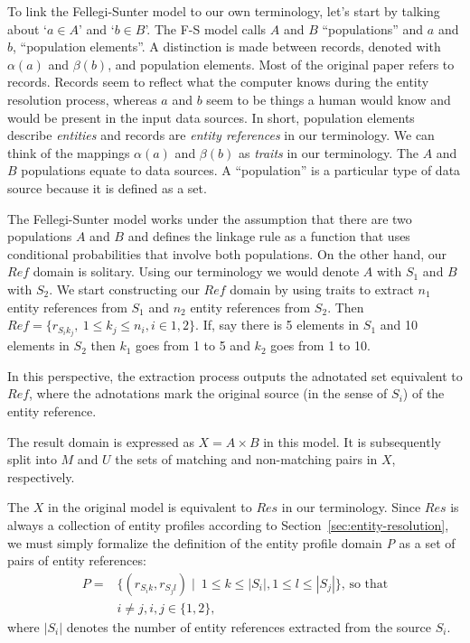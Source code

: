 To link the Fellegi-Sunter model to our own terminology, let's start by talking
about `$a \in A$' and `$b \in B$'.
The F-S model calls $A$ and $B$ ``populations'' and $a$ and $b$,
``population elements''.
A distinction is made between records, denoted with $\alpha(a)$ and
$\beta(b)$, and population elements.
Most of the original paper refers to records.
Records seem to reflect what the computer knows during the entity resolution
process, whereas $a$ and $b$ seem to be things a human would know and would be
present in the input data sources.
In short, population elements describe \textit{entities} and records are
\textit{entity references} in our terminology.
We can think of the mappings $\alpha(a)$ and $\beta(b)$ as \textit{traits} in
our terminology.
The $A$ and $B$ populations equate to data sources.
A ``population'' is a particular type of data source because it is defined
as a set.

The Fellegi-Sunter model works under the assumption that there are two
populations $A$ and $B$ and defines the linkage rule as a function that uses
conditional probabilities that involve both populations.
On the other hand, our $Ref$ domain is solitary.
Using our terminology we would denote $A$ with $S_1$ and $B$ with $S_2$.
We start constructing our $Ref$ domain by using traits to extract $n_1$
entity references from $S_1$ and $n_2$ entity references from $S_2$.
Then $Ref = \{r_{{S_i}{k_j}},~1 \leq k_j \leq n_i, i \in {1, 2} \}$.
If, say there is 5 elements in $S_1$ and 10 elements in $S_2$ then $k_1$ goes
from 1 to 5 and $k_2$ goes from 1 to 10.

In this perspective, the extraction process outputs the adnotated set equivalent
to $Ref$, where the adnotations mark the original source (in the sense of $S_i$)
of the entity reference.

The result domain is expressed as $X = A \times B$ in this model.
It is subsequently split into $M$ and $U$ the sets of matching and
non-matching pairs in $X$, respectively.

The $X$ in the original model is equivalent to $Res$ in our terminology.
Since $Res$ is always a collection of entity profiles according to
Section~\ref{sec:entity-resolution}, we must simply formalize the definition
of the entity profile domain \textit{P} as a set of pairs of entity references:
\begin{align}
    P = &\{(r_{{S_i}{k}}, r_{{S_j}{l}})\mid~1 \leq k \leq |S_i|,
    1 \leq l \leq |S_j|\}\textrm{, so that}\nonumber\\
    &i \neq j, i,j \in \{1, 2\}\textrm{,}\nonumber
\end{align}
where $|S_i|$ denotes the number of entity references extracted from the
source $S_i$.

